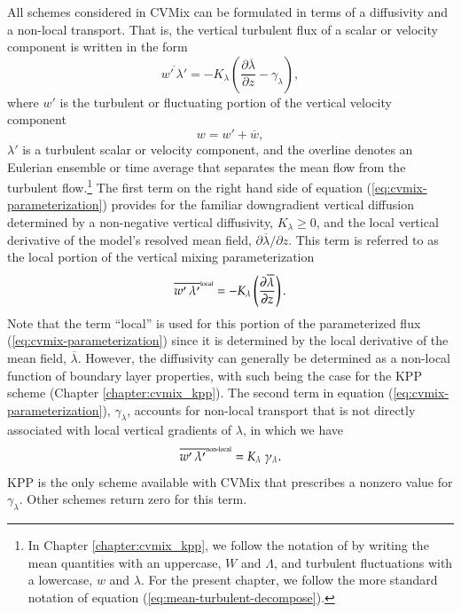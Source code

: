 All schemes considered in CVMix can be formulated in terms of a
diffusivity and a non-local transport.  That is, the vertical
turbulent flux of a scalar or velocity component is written in the
form
\begin{equation}
  \overline{w' \, \lambda'} = 
  -K_{\lambda} \left( \frac{\partial \overline{\lambda}}{\partial z} - \gamma_{\lambda} \right),
\label{eq:cvmix-parameterization}
\end{equation}
where $w'$ is the turbulent or fluctuating portion of the vertical
velocity component
\begin{equation}
 w = w' + \overline{w},
\label{eq:mean-turbulent-decompose}
\end{equation}
$\lambda'$ is a turbulent scalar or velocity component, and the
overline denotes an Eulerian ensemble or time average that separates
the mean flow from the turbulent flow.\footnote{In Chapter
  \ref{chapter:cvmix_kpp}, we follow the notation of \cite{LargeKPP}
  by writing the mean quantities with an uppercase, $W$ and $\Lambda$,
  and turbulent fluctuations with a lowercase, $w$ and $\lambda$. For
  the present chapter, we follow the more standard notation of
  equation (\ref{eq:mean-turbulent-decompose}).}  The first term on
the right hand side of equation (\ref{eq:cvmix-parameterization})
provides for the familiar downgradient vertical diffusion determined
by a non-negative vertical diffusivity, $K_{\lambda} \ge 0$, and the
local vertical derivative of the model's resolved mean field,
$\partial \overline{\lambda} / \partial z$.  This term is referred to
as the local portion of the vertical mixing parameterization
\begin{equation}
\overline{w' \, \lambda'}^{\mbox{\tiny local}} = -K_{\lambda} \left( \frac{\partial \overline{\lambda}}{\partial z} \right).
\end{equation}
Note that the term ``local'' is used for this portion of the
parameterized flux (\ref{eq:cvmix-parameterization}) since it is
determined by the local derivative of the mean field,
$\overline{\lambda}$.  However, the diffusivity can generally be
determined as a non-local function of boundary layer properties, with
such being the case for the KPP scheme (Chapter
\ref{chapter:cvmix_kpp}).  The second term in equation
(\ref{eq:cvmix-parameterization}), $\gamma_{\lambda}$, accounts for
non-local transport that is not directly associated with local
vertical gradients of $\lambda$, in which we have
\begin{equation}
\overline{w' \, \lambda'}^{\mbox{\tiny non-local}} = K_{\lambda} \; \gamma_{\lambda}.
\end{equation}
KPP is the only scheme available with CVMix that prescribes a nonzero
value for $\gamma_{\lambda}$.  Other schemes return zero for this
term.

